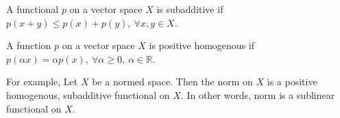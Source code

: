 
\begin{definition}[subadditive]
	A functional $p$ on a vector space $X$ is subadditive if
	$p(x+y) \le p(x) + p(y),\ \forall x,y \in X$.
\end{definition}

\begin{definition}
	A function $p$ on a vector space $X$ is positive homogenous if
	$p(\alpha x) = \alpha p(x),\ \forall \alpha \ge 0,\ \alpha \in \mathbb{R}$.
\end{definition}
For example, Let $X$ be a normed space. Then the norm on $X$ is a positive homogenous, subadditive functional on $X$.
In other words, norm is a sublinear functional on $X$.

